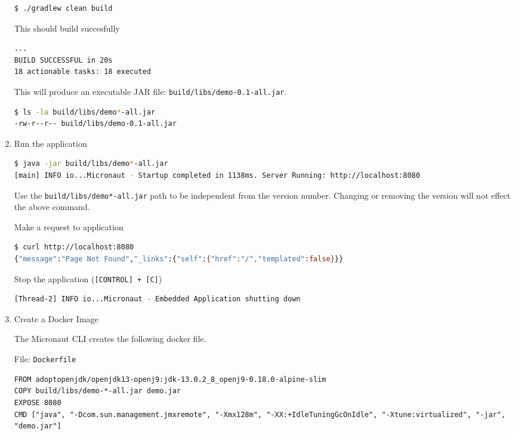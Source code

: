 \begin{enumerate}
\begin{lstlisting}[language=bash]
$ ./gradlew clean build
\end{lstlisting}

This should build succesfully

\begin{lstlisting}[language=bash]
...
BUILD SUCCESSFUL in 20s
18 actionable tasks: 18 executed
\end{lstlisting}

This will produce an executable JAR file: \texttt{build/libs/demo-0.1-all.jar}.

\begin{lstlisting}[language=bash]
$ ls -la build/libs/demo*-all.jar
-rw-r--r-- build/libs/demo-0.1-all.jar
\end{lstlisting}

\item Run the application

\begin{lstlisting}[language=bash]
$ java -jar build/libs/demo*-all.jar
[main] INFO io...Micronaut - Startup completed in 1138ms. Server Running: http://localhost:8080
\end{lstlisting}

Use the \texttt{build/libs/demo*-all.jar} path to be independent from the version number.  Changing or removing the version will not effect the above command.

Make a request to application

\begin{lstlisting}[language=bash]
$ curl http://localhost:8080
{"message":"Page Not Found","_links":{"self":{"href":"/","templated":false}}}
\end{lstlisting}

Stop the application (\texttt{[CONTROL] + [C]})

\begin{lstlisting}[language=bash]
[Thread-2] INFO io...Micronaut - Embedded Application shutting down
\end{lstlisting}

\item Create a Docker Image

The Micronaut CLI creates the following docker file.

File: \texttt{Dockerfile}

\begin{lstlisting}[language=Docker]
FROM adoptopenjdk/openjdk13-openj9:jdk-13.0.2_8_openj9-0.18.0-alpine-slim
COPY build/libs/demo-*-all.jar demo.jar
EXPOSE 8080
CMD ["java", "-Dcom.sun.management.jmxremote", "-Xmx128m", "-XX:+IdleTuningGcOnIdle", "-Xtune:virtualized", "-jar", "demo.jar"]
\end{lstlisting}


\end{enumerate}
